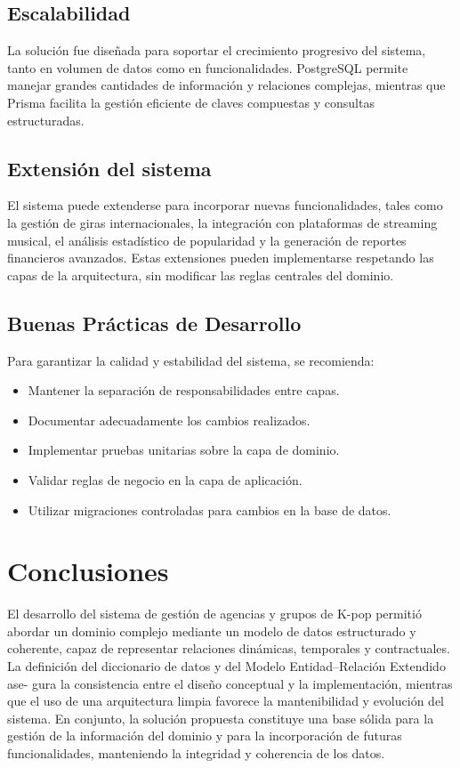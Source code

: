\documentclass[12pt,a4paper,spanish,oneside]{report}
\begin{document}
\section{Escalabilidad}
La solución fue diseñada para soportar el crecimiento progresivo del sistema, tanto en
volumen de datos como en funcionalidades. PostgreSQL permite manejar grandes cantidades de información y relaciones complejas, mientras que Prisma facilita la gestión
eficiente de claves compuestas y consultas estructuradas.

\section{Extensión del sistema}
El sistema puede extenderse para incorporar nuevas funcionalidades, tales como la
gestión de giras internacionales, la integración con plataformas de streaming musical, el
análisis estadístico de popularidad y la generación de reportes financieros avanzados.
Estas extensiones pueden implementarse respetando las capas de la arquitectura, sin
modificar las reglas centrales del dominio.

\section{Buenas Prácticas de Desarrollo}
Para garantizar la calidad y estabilidad del sistema, se recomienda:
\begin{itemize}
    \item Mantener la separación de responsabilidades entre capas.
    \item Documentar adecuadamente los cambios realizados.
    \item Implementar pruebas unitarias sobre la capa de dominio.
    \item Validar reglas de negocio en la capa de aplicación.
    \item Utilizar migraciones controladas para cambios en la base de datos.
\end{itemize}

\chapter{Conclusiones}
El desarrollo del sistema de gestión de agencias y grupos de K-pop permitió abordar
un dominio complejo mediante un modelo de datos estructurado y coherente, capaz de
representar relaciones dinámicas, temporales y contractuales.
La definición del diccionario de datos y del Modelo Entidad–Relación Extendido ase-
gura la consistencia entre el diseño conceptual y la implementación, mientras que el uso
de una arquitectura limpia favorece la mantenibilidad y evolución del sistema.
En conjunto, la solución propuesta constituye una base sólida para la gestión de la
información del dominio y para la incorporación de futuras funcionalidades, manteniendo
la integridad y coherencia de los datos.
\end{document}
